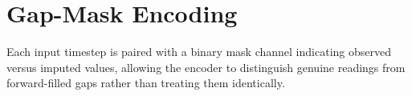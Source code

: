 \section{Gap-Mask Encoding}
Each input timestep is paired with a binary mask channel indicating observed versus imputed
values, allowing the encoder to distinguish genuine readings from forward-filled gaps rather
than treating them identically.
